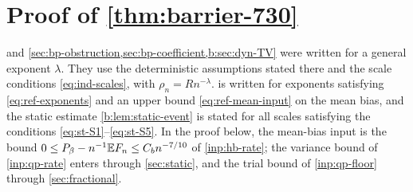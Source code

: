 \section{Proof of \texorpdfstring{\cref{thm:barrier-730}}{the barrier theorem}}\label{sec:bp-730}

 and \cref{sec:bp-obstruction,sec:bp-coefficient,b:sec:dyn-TV} were written for a general exponent $\lambda$. They use the deterministic assumptions stated there and the scale conditions \eqref{eq:ind-scales}, with $\rho_n=Rn^{-\lambda}$.  is written for exponents satisfying \eqref{eq:ref-exponents} and an upper bound \eqref{eq:ref-mean-input} on the mean bias, and the static estimate \cref{b:lem:static-event} is stated for all scales satisfying the conditions \eqref{eq:st-S1}--\eqref{eq:st-S5}. In the proof below, the mean-bias input is the bound $0\le P_\beta-n^{-1}\mathbb E F_n\le C_bn^{-7/10}$ of \cref{inp:hb-rate}; the variance bound of \cref{inp:qp-rate} enters through \cref{sec:static}, and the trial bound of \cref{inp:qp-floor} through \cref{sec:fractional}.

